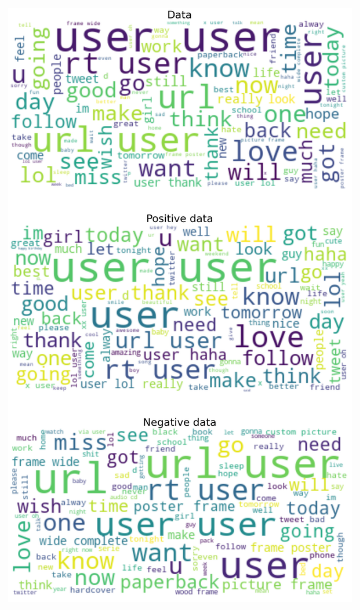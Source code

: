 \documentclass{article}
\begin{document}
\begin{itemize}
\begin{figure}[H]
\centering
\captionsetup{justification=centering}
\begin{subfigure}[b]{0.24\textwidth}
\centering
\includegraphics[width=\textwidth]{chapter-06/section-01-01/07/visualization/1/wordcloud.png}
\end{subfigure}
\begin{subfigure}[b]{0.24\textwidth}
\centering

\end{subfigure}
\end{figure}
\end{itemize}
\end{document}
